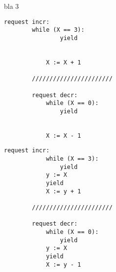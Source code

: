 bla 3


\noindent
\begin{minipage}[t]{0.48\textwidth}
	\begin{lstlisting}[caption={Fred (serializable)}]
		request incr: 
        while (X == 3):
		        yield


		    X := X + 1
		
		///////////////////////
		
		request decr: 
		    while (X == 0): 
		        yield


		    X := X - 1
	\end{lstlisting}
\end{minipage}
\hfill
\begin{minipage}[t]{0.48\textwidth}
	\begin{lstlisting}[caption={Fred2 (not serializable)}]
		request incr:
		    while (X == 3):
			    yield
		    y := X
		    yield
		    X := y + 1
		
		///////////////////////
		
		request decr: 
		    while (X == 0):
			    yield
		    y := X
		    yield
		    X := y - 1
	\end{lstlisting}
\end{minipage}%



%			
%			  
%			 
%		
%			
%			
%			
\newpage